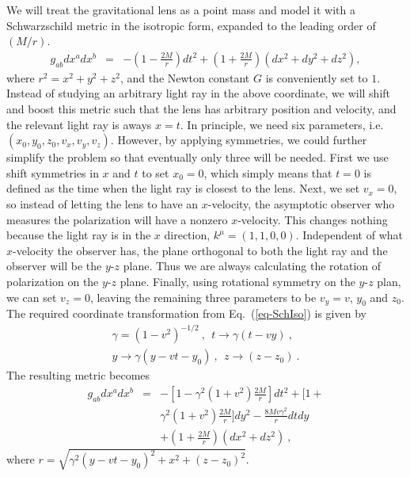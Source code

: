 \documentclass[aps,showpacs,twocolumn,floats,prd,superscriptaddress,nofootinbib]{revtex4}
\begin{document}
We will treat the gravitational lens as a point mass and model it with a Schwarzschild metric in the isotropic form, expanded to the leading order of $(M/r)$. 
\begin{eqnarray}
g_{ab}dx^adx^b &=& -\left(1-\frac{2M}{r}\right)dt^2 + \left(1+\frac{2M}{r}\right)  \left(dx^2+dy^2+dz^2\right), 
\label{eq-SchIso}
\end{eqnarray}
where  $r^2 = x^2 + y^2 + z^2$,  and the Newton constant $G$ is conveniently set to $1$.
Instead of studying an arbitrary light ray in the above coordinate, we will shift and boost this metric such that the lens has arbitrary position and velocity, and the relevant light ray is aways $x=t$.
In principle, we need six parameters, i.e. $(x_0,y_0,z_0,v_x,v_y,v_z)$. However, 
by applying symmetries, we could further simplify the problem so that eventually only three will be needed. 
First we use shift symmetries in $x$ and $t$ to set $x_0=0$, which simply means that $t=0$ is defined as the time when the light ray is closest to the lens. Next, we set $v_x=0$, so instead of letting the lens to have an $x$-velocity, the asymptotic observer who measures the polarization will have a nonzero $x$-velocity. 
This changes nothing because the light ray is in the $x$ direction, $k^\mu = (1,1,0,0)$.
Independent of what $x$-velocity the observer has, the plane orthogonal to both the light ray and the observer will be the $y$-$z$ plane.
Thus we are always calculating the rotation of polarization on the $y$-$z$ plane.
Finally, using rotational symmetry on the $y$-$z$ plan, we can set $v_z=0$, leaving the remaining three parameters to be $v_y=v$, $y_0$ and $z_0$. The required coordinate transformation from Eq.~(\ref{eq-SchIso}) is given by
\begin{eqnarray}
\gamma = (1-v^2)^{-1/2}~, \ \ t \rightarrow \gamma(t-vy)~, \nonumber \\
 y\rightarrow \gamma(y-vt-y_0)~, \ \ z\rightarrow (z-z_0)~.
\end{eqnarray}
The resulting metric becomes
\begin{eqnarray}
\label{eq-metric}
g_{ab}dx^adx^b &=& -\left[1-\gamma^2(1+v^2)\frac{2M}{r}\right]dt^2   
+ \biggl [1  + \nonumber \\
&& \gamma^2(1+v^2)\frac{2M}{r} \biggr]dy^2 
- \frac{8Mv\gamma^2}{r}dtdy  \nonumber \\
&& + \left(1+\frac{2M}{r}\right)(dx^2+dz^2)~,
\end{eqnarray}
where $r = \sqrt{ \gamma^2(y-vt-y_0)^2 + x^2 + (z-z_0)^2 }$. 
\end{document}

